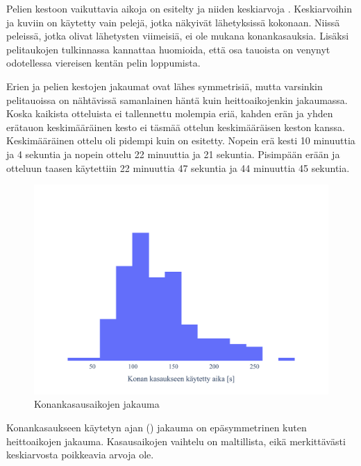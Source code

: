     Pelien kestoon vaikuttavia aikoja on esitelty 
    ja niiden keskiarvoja .
    Keskiarvoihin ja kuviin on käytetty vain pelejä, jotka näkyivät lähetyksissä kokonaan.
    Niissä peleissä, jotka olivat lähetysten viimeisiä, ei ole mukana konankasauksia.
    Lisäksi pelitaukojen tulkinnassa kannattaa huomioida,
    että osa tauoista on venynyt odotellessa viereisen kentän pelin loppumista.

    Erien ja pelien kestojen jakaumat ovat lähes symmetrisiä,
    mutta varsinkin pelitauoissa on nähtävissä samanlainen häntä kuin heittoaikojenkin jakaumassa.
    Koska kaikista otteluista ei tallennettu molempia eriä,
    kahden erän ja yhden erätauon keskimääräinen kesto ei täsmää ottelun keskimääräisen keston kanssa.
    Keskimääräinen ottelu oli pidempi kuin  on esitetty.
    Nopein erä kesti 10 minuuttia ja 4 sekuntia ja nopein ottelu 22 minuuttia ja 21 sekuntia.
    Pisimpään erään ja otteluun taasen käytettiin 22 minuuttia 47 sekuntia ja 44 minuuttia 45 sekuntia.

    \begin{figure}[!ht]
        \centering
        \includegraphics[width=\textwidth]{figures/konat.pdf}
        \caption{Konankasausaikojen jakauma\label{fig:konat}}
    \end{figure}

    Konankasaukseen käytetyn ajan () jakauma on epäsymmetrinen kuten heittoaikojen jakauma.
    Kasausaikojen vaihtelu on maltillista, eikä merkittävästi keskiarvosta poikkeavia arvoja ole.

